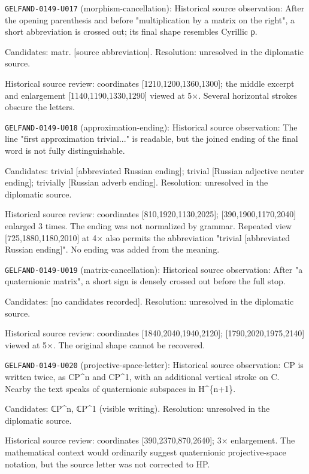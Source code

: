 \noindent\texttt{GELFAND-0149-U017} (morphism-cancellation): Historical source observation: After the opening parenthesis and before "multiplication by a matrix on the right", a short abbreviation is crossed out; its final shape resembles Cyrillic р.\par
Candidates: matr. [source abbreviation]. Resolution: unresolved in the diplomatic source.\par
Historical source review: coordinates [1210,1200,1360,1300]; the middle excerpt and enlargement [1140,1190,1330,1290] viewed at 5×. Several horizontal strokes obscure the letters.\par

\noindent\texttt{GELFAND-0149-U018} (approximation-ending): Historical source observation: The line "first approximation trivial..." is readable, but the joined ending of the final word is not fully distinguishable.\par
Candidates: trivial [abbreviated Russian ending]; trivial [Russian adjective neuter ending]; trivially [Russian adverb ending]. Resolution: unresolved in the diplomatic source.\par
Historical source review: coordinates [810,1920,1130,2025]; [390,1900,1170,2040] enlarged 3 times. The ending was not normalized by grammar. Repeated view [725,1880,1180,2010] at 4× also permits the abbreviation "trivial [abbreviated Russian ending]". No ending was added from the meaning.\par

\noindent\texttt{GELFAND-0149-U019} (matrix-cancellation): Historical source observation: After "a quaternionic matrix", a short sign is densely crossed out before the full stop.\par
Candidates: [no candidates recorded]. Resolution: unresolved in the diplomatic source.\par
Historical source review: coordinates [1840,2040,1940,2120]; [1790,2020,1975,2140] viewed at 5×. The original shape cannot be recovered.\par

\noindent\texttt{GELFAND-0149-U020} (projective-space-letter): Historical source observation: CP is written twice, as CP\textasciicircum{}n and CP\textasciicircum{}1, with an additional vertical stroke on C. Nearby the text speaks of quaternionic subspaces in H\textasciicircum{}\{n+1\}.\par
Candidates: ℂP\textasciicircum{}n, ℂP\textasciicircum{}1 (visible writing). Resolution: unresolved in the diplomatic source.\par
Historical source review: coordinates [390,2370,870,2640]; 3× enlargement. The mathematical context would ordinarily suggest quaternionic projective-space notation, but the source letter was not corrected to HP.\par



